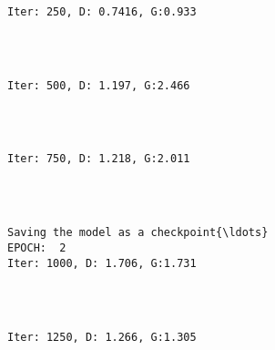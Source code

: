 \documentclass[11pt]{article}
\begin{document}
    \begin{Verbatim}[commandchars=\\\{\}]

Iter: 250, D: 0.7416, G:0.933
    \end{Verbatim}

    \begin{center}
    \end{center}
    { \hspace*{\fill} \\}
    
    \begin{Verbatim}[commandchars=\\\{\}]

Iter: 500, D: 1.197, G:2.466
    \end{Verbatim}

    \begin{center}
    \end{center}
    { \hspace*{\fill} \\}
    
    \begin{Verbatim}[commandchars=\\\{\}]

Iter: 750, D: 1.218, G:2.011
    \end{Verbatim}

    \begin{center}
    \end{center}
    { \hspace*{\fill} \\}
    
    \begin{Verbatim}[commandchars=\\\{\}]

Saving the model as a checkpoint{\ldots}
EPOCH:  2
Iter: 1000, D: 1.706, G:1.731
    \end{Verbatim}

    \begin{center}
    \end{center}
    { \hspace*{\fill} \\}
    
    \begin{Verbatim}[commandchars=\\\{\}]

Iter: 1250, D: 1.266, G:1.305
    \end{Verbatim}
\end{document}
